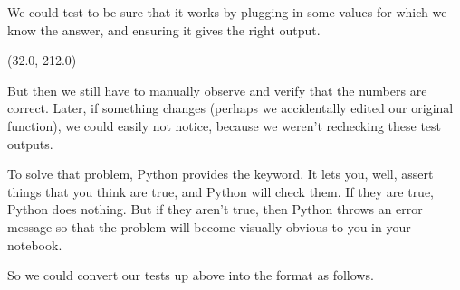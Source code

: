 \documentclass[letterpaper,10pt,english]{jupyterBook}
\begin{document}
\begin{sphinxVerbatim}[commandchars=\\\{\}]
    
     
\end{sphinxVerbatim}

\sphinxAtStartPar
We could test to be sure that it works by plugging in some values for which we know the answer, and ensuring it gives the right output.

\begin{sphinxVerbatim}[commandchars=\\\{\}]
     
\end{sphinxVerbatim}

\begin{sphinxVerbatim}[commandchars=\\\{\}]
(32.0, 212.0)
\end{sphinxVerbatim}

\sphinxAtStartPar
But then we still have to manually observe and verify that the numbers are correct.  Later, if something changes (perhaps we accidentally edited our original function), we could easily not notice, because we weren’t re\sphinxhyphen{}checking these test outputs.

\sphinxAtStartPar
To solve that problem, Python provides the  keyword.  It lets you, well, assert things that you think are true, and Python will check them.  If they are true, Python does nothing.  But if they aren’t true, then Python throws an error message so that the problem will become visually obvious to you in your notebook.

\sphinxAtStartPar
So we could convert our tests up above into the  format as follows.

\begin{sphinxVerbatim}[commandchars=\\\{\}]
     
     
\end{sphinxVerbatim}
\end{document}

